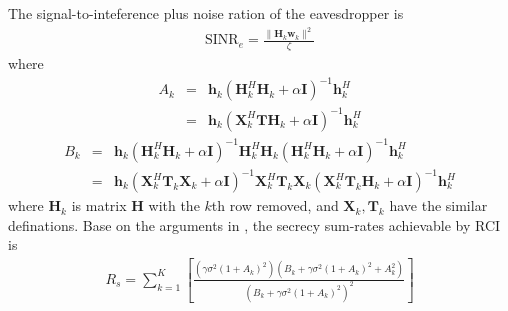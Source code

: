 \documentclass[12pt,journal,draftclsnofoot,onecolumn]{IEEEtran}
\begin{document}
The signal-to-inteference plus noise ration of the eavesdropper is
\begin{eqnarray}
\mathrm{SINR}_{e} = \frac{\|\mathbf{H}_k\mathbf{w}_k\|^2}{\zeta}
\end{eqnarray}
where
\begin{eqnarray}
A_k &=& \mathbf{h}_k\left(\mathbf{H}_k^H\mathbf{H}_k + \alpha\mathbf{I}\right)^{-1}\mathbf{h}_k^H \label{eq:A_k}\\
&=& \mathbf{h}_k\left(\mathbf{X}_k^H\mathbf{T}\mathbf{H}_k + \alpha\mathbf{I}\right)^{-1}\mathbf{h}_k^H
\end{eqnarray}
\begin{eqnarray}
B_k &=& \mathbf{h}_k\left(\mathbf{H}_k^H\mathbf{H}_k + \alpha\mathbf{I}\right)^{-1}\mathbf{H}_k^H\mathbf{H}_k\left(\mathbf{H}_k^H\mathbf{H}_k + \alpha\mathbf{I}\right)^{-1}\mathbf{h}_k^H \label{eq:B_k}\\
&=&\mathbf{h}_k\left(\mathbf{X}_k^H\mathbf{T}_k\mathbf{X}_k + \alpha\mathbf{I}\right)^{-1}\mathbf{X}_k^H\mathbf{T}_k\mathbf{X}_k\left(\mathbf{X}_k^H\mathbf{T}_k\mathbf{H}_k + \alpha\mathbf{I}\right)^{-1}\mathbf{h}_k^H
\end{eqnarray}
where $\mathbf{H}_k$ is matrix $\mathbf{H}$ with the $k$th row removed, and $\mathbf{X}_k,\mathbf{T}_k$ have the similar definations.
Base on the arguments in \cite{geraci2012secrecy}, the secrecy sum-rates achievable by RCI is
\begin{eqnarray}
R_s = \sum_{k=1}^{K}\left[\frac{\left(\gamma\sigma^2(1+ A_k)^2\right)\left(B_k + \gamma\sigma^2(1+ A_k)^2 + A_k^2\right)}{\left(B_k + \gamma\sigma^2(1+ A_k)^2\right)^2}\right] \label{eq:sum_rates}
\end{eqnarray}
\end{document}
